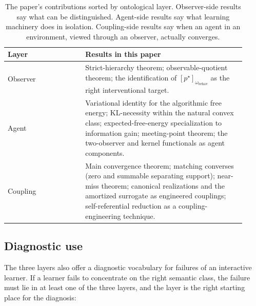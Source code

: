 \documentclass[11pt]{article}
\theoremstyle{definition}
\theoremstyle{remark}
\begin{document}
\begin{table}[h]
\centering\small
\begin{tabular}{p{0.30\linewidth}p{0.62\linewidth}}
\toprule
Layer & Results in this paper \\
\midrule
Observer & Strict-hierarchy theorem; observable-quotient theorem; the identification of $[p^\star]_{\omega_{\mathrm{behav}}}$ as the right interventional target. \\
Agent & Variational identity for the algorithmic free energy; KL-necessity within the natural convex class; expected-free-energy specialization to information gain; meeting-point theorem; the two-observer and kernel functionals as agent components. \\
Coupling & Main convergence theorem; matching converses (zero and summable separating support); near-miss theorem; canonical realizations and the amortized surrogate as engineered couplings; self-referential reduction as a coupling-engineering technique. \\
\bottomrule
\end{tabular}
\caption{The paper's contributions sorted by ontological layer. Observer-side results say what can be distinguished. Agent-side results say what learning machinery does in isolation. Coupling-side results say when an agent in an environment, viewed through an observer, actually converges.}
\label{tab:ontology}
\end{table}

\subsection{Diagnostic use}
\label{sec:ontology-diagnostic}

The three layers also offer a diagnostic vocabulary for failures of an interactive learner. If a learner fails to concentrate on the right semantic class, the failure must lie in at least one of the three layers, and the layer is the right starting place for the diagnosis:
\end{document}
